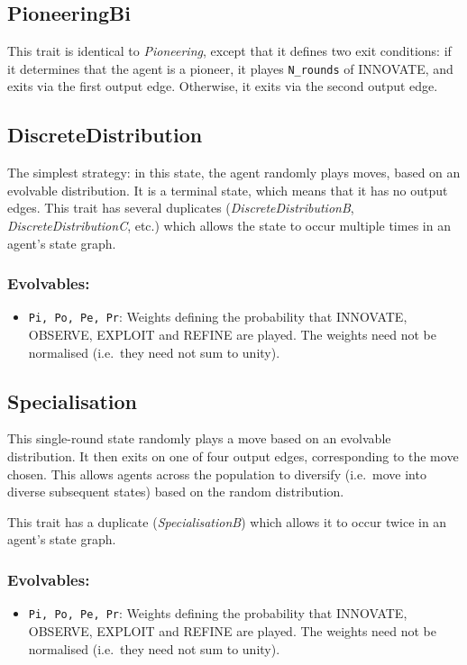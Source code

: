 \documentclass[a4paper,10pt]{article}
\begin{document}
\subsection{PioneeringBi}
This trait is identical to \emph{Pioneering}, except that it defines two exit conditions: if it determines
that the agent is a pioneer, it playes \texttt{N\_rounds} of INNOVATE, and exits via the first output
edge. Otherwise, it exits via the second output edge.

\subsection{DiscreteDistribution}
The simplest strategy: in this state, the agent randomly plays moves, based on an evolvable distribution.
It is a terminal state, which means that it has no output edges. This trait has several duplicates
(\emph{DiscreteDistributionB}, \emph{DiscreteDistributionC}, etc.) which allows the state to occur multiple
times in an agent's state graph.

\subsubsection*{Evolvables:}
\begin{itemize}
 \item \texttt{Pi, Po, Pe, Pr}: Weights defining the probability that INNOVATE, OBSERVE, EXPLOIT and REFINE
   are played. The weights need not be normalised (i.e.\ they need not sum to unity).
\end{itemize}

\subsection{Specialisation}
This single-round state randomly plays a move based on an evolvable distribution. It then exits on one
of four output edges, corresponding to the move chosen. This allows agents across the population to
diversify (i.e.\ move into diverse subsequent states) based on the random distribution.

This trait has a duplicate
(\emph{SpecialisationB}) which allows it to occur twice
in an agent's state graph.

\subsubsection*{Evolvables:}
\begin{itemize}
 \item \texttt{Pi, Po, Pe, Pr}: Weights defining the probability that INNOVATE, OBSERVE, EXPLOIT and REFINE
   are played. The weights need not be normalised (i.e.\ they need not sum to unity).
\end{itemize}
\end{document}

